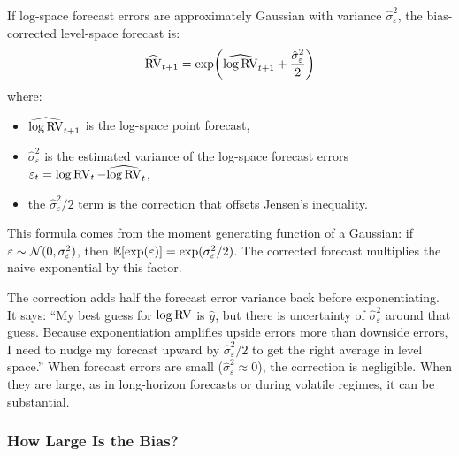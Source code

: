 If log-space forecast errors are approximately Gaussian with variance $\hat{\sigma}^2_\varepsilon$, the bias-corrected level-space forecast is:
\begin{equation}
\label{eq:retransform}
\widehat{\operatorname{RV}}_{t+1} = \exp\!\left(\widehat{\log \operatorname{RV}}_{t+1} + \frac{\hat{\sigma}^2_\varepsilon}{2}\right)
\end{equation}
where:
\begin{itemize}[nosep]
  \item $\widehat{\log \operatorname{RV}}_{t+1}$ is the log-space point forecast,
  \item $\hat{\sigma}^2_\varepsilon$ is the estimated variance of the log-space forecast errors $\varepsilon_t = \log \operatorname{RV}_t - \widehat{\log \operatorname{RV}}_t$,
  \item the $\hat{\sigma}^2_\varepsilon / 2$ term is the correction that offsets Jensen's inequality.
\end{itemize}

This formula comes from the moment generating function of a Gaussian: if $\varepsilon \sim \mathcal{N}(0, \sigma^2_\varepsilon)$, then $\mathbb{E}[\exp(\varepsilon)] = \exp(\sigma^2_\varepsilon / 2)$.
The corrected forecast multiplies the naive exponential by this factor.

\begin{intuition}
The correction adds half the forecast error variance back before exponentiating.
It says: ``My best guess for $\log \operatorname{RV}$ is $\hat{y}$, but there is uncertainty of $\hat{\sigma}^2_\varepsilon$ around that guess.
Because exponentiation amplifies upside errors more than downside errors, I need to nudge my forecast upward by $\hat{\sigma}^2_\varepsilon / 2$ to get the right average in level space.''
When forecast errors are small ($\hat{\sigma}^2_\varepsilon \approx 0$), the correction is negligible.
When they are large, as in long-horizon forecasts or during volatile regimes, it can be substantial.
\end{intuition}

\subsubsection{How Large Is the Bias?}

